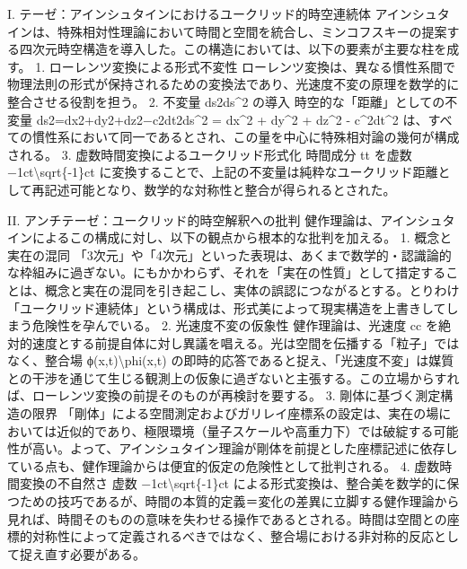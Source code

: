 \documentclass{article}
\begin{document}
I. テーゼ：アインシュタインにおけるユークリッド的時空連続体
アインシュタインは、特殊相対性理論において時間と空間を統合し、ミンコフスキーの提案する四次元時空構造を導入した。この構造においては、以下の要素が主要な柱を成す。
1. ローレンツ変換による形式不変性
ローレンツ変換は、異なる慣性系間で物理法則の形式が保持されるための変換法であり、光速度不変の原理を数学的に整合させる役割を担う。
2. 不変量 ds2ds\textasciicircum{}2 の導入
時空的な「距離」としての不変量
ds2=dx2+dy2+dz2−c2dt2ds\textasciicircum{}2 = dx\textasciicircum{}2 + dy\textasciicircum{}2 + dz\textasciicircum{}2 - c\textasciicircum{}2dt\textasciicircum{}2 
は、すべての慣性系において同一であるとされ、この量を中心に特殊相対論の幾何が構成される。
3. 虚数時間変換によるユークリッド形式化
時間成分 tt を虚数 −1ct\textbackslash{}sqrt\{-1\}ct に変換することで、上記の不変量は純粋なユークリッド距離として再記述可能となり、数学的な対称性と整合が得られるとされた。

II. アンチテーゼ：ユークリッド的時空解釈への批判
健作理論は、アインシュタインによるこの構成に対し、以下の観点から根本的な批判を加える。
1. 概念と実在の混同
「3次元」や「4次元」といった表現は、あくまで数学的・認識論的な枠組みに過ぎない。にもかかわらず、それを「実在の性質」として措定することは、概念と実在の混同を引き起こし、実体の誤認につながるとする。とりわけ「ユークリッド連続体」という構成は、形式美によって現実構造を上書きしてしまう危険性を孕んでいる。
2. 光速度不変の仮象性
健作理論は、光速度 cc を絶対的速度とする前提自体に対し異議を唱える。光は空間を伝播する「粒子」ではなく、整合場 ϕ(x,t)\textbackslash{}phi(x,t) の即時的応答であると捉え、「光速度不変」は媒質との干渉を通じて生じる観測上の仮象に過ぎないと主張する。この立場からすれば、ローレンツ変換の前提そのものが再検討を要する。
3. 剛体に基づく測定構造の限界
「剛体」による空間測定およびガリレイ座標系の設定は、実在の場においては近似的であり、極限環境（量子スケールや高重力下）では破綻する可能性が高い。よって、アインシュタイン理論が剛体を前提とした座標記述に依存している点も、健作理論からは便宜的仮定の危険性として批判される。
4. 虚数時間変換の不自然さ
虚数 −1ct\textbackslash{}sqrt\{-1\}ct による形式変換は、整合美を数学的に保つための技巧であるが、時間の本質的定義＝変化の差異に立脚する健作理論から見れば、時間そのものの意味を失わせる操作であるとされる。時間は空間との座標的対称性によって定義されるべきではなく、整合場における非対称的反応として捉え直す必要がある。
\end{document}
